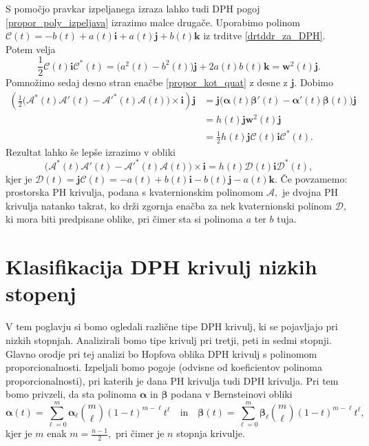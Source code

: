 \documentclass[12pt,a4paper,twoside]{article}
\theoremstyle{definition} %
\theoremstyle{plain} %
\theoremstyle{primerstyle}
\numberwithin{equation}{section}  %
\newcommand{\iV}{\mathbf{i}}
\newcommand{\jV}{\mathbf{j}}
\newcommand{\kV}{\mathbf{k}}
\newcommand{\wV}{\mathbf{w}}
\newcommand{\AQ}{\mathcal{A}}
\newcommand{\CQ}{\mathcal{C}}
\newcommand{\DQ}{\mathcal{D}}
\newcommand{\balpha}{\boldsymbol \alpha}
\newcommand{\bbeta}{\boldsymbol \beta}
\begin{document}
S pomočjo pravkar izpeljanega izraza lahko tudi DPH pogoj \eqref{propor_poly_izpeljava} izrazimo malce drugače. Uporabimo polinom $\CQ(t)=-b(t)+a(t)\iV+a(t)\jV+b(t)\kV$ iz trditve \ref{drtddr_za_DPH}. Potem velja
\begin{equation*}
	\frac{1}{2}\CQ(t)\iV\CQ^*(t)=\big(a^2(t)-b^2(t)\big)\jV+2a(t)b(t)\kV=\wV^2(t)\jV.
\end{equation*}
Pomnožimo sedaj desno stran enačbe \eqref{propor_kot_quat} z desne z $\jV.$ Dobimo
\begin{align*}
	\left(\frac{1}{2}\big(\AQ^*(t)\AQ'(t)-\AQ'^*(t)\AQ(t)\big)\times\iV\right)\jV&=\jV\big(\balpha(t)\bbeta'(t)-\balpha'(t)\bbeta(t)\big)\jV\\
	&=h(t)\jV\wV^2(t)\jV\\
	&=\frac{1}{2}h(t)\jV\CQ(t)\iV\CQ^*(t).
\end{align*}
Rezultat lahko še lepše izrazimo v obliki
\begin{equation}
	\label{dvojnaPH_quat_pogoj}
	\big(\AQ^*(t)\AQ'(t)-\AQ'^*(t)\AQ(t)\big)\times\iV=h(t)\DQ(t)\iV\DQ^*(t),
\end{equation}
kjer je $\DQ(t)=\jV\CQ(t)=-a(t)+b(t)\iV-b(t)\jV-a(t)\kV.$ Če povzamemo: prostorska PH krivulja, podana s kvaternionskim polinomom $\AQ,$ je dvojna PH krivulja natanko takrat, ko drži zgornja enačba za nek kvaternionski polinom $\DQ,$ ki mora biti predpisane oblike, pri čimer sta si polinoma $a$ ter $b$ tuja.


\section{Klasifikacija DPH krivulj nizkih stopenj}

V tem poglavju si bomo ogledali različne tipe DPH krivulj, ki se pojavljajo pri nizkih stopnjah. Analizirali bomo tipe krivulj pri tretji, peti in sedmi stopnji. Glavno orodje pri tej analizi bo Hopfova oblika DPH krivulj s polinomom proporcionalnosti. Izpeljali bomo pogoje (odvisne od koeficientov polinoma proporcionalnosti), pri katerih je dana PH krivulja tudi DPH krivulja. Pri tem bomo privzeli, da sta polinoma $\balpha$ in $\bbeta$ podana v Bernsteinovi obliki
\begin{equation*}
	\balpha(t)=\sum_{\ell=0}^m\balpha_\ell\binom{m}{\ell}(1-t)^{m-\ell}t^\ell\quad\text{in}\quad\bbeta(t)=\sum_{\ell=0}^m\bbeta_\ell\binom{m}{\ell}(1-t)^{m-\ell}t^\ell,
\end{equation*}
kjer je $m$ enak $m=\frac{n-1}{2},$ pri čimer je $n$ stopnja krivulje.
\end{document}
